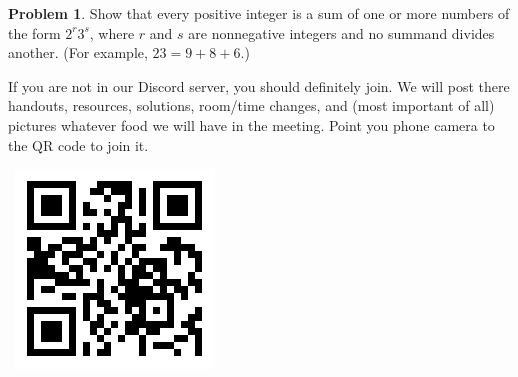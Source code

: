 \documentclass{scrartcl}
\theoremstyle{definition}
\newtheorem{prob}{Problem}
\begin{document}
	\begin{prob}%
		Show that every positive integer is a sum of one or more numbers of the form \(2^r3^s\), where \(r\) and \(s\) are nonnegative integers and no summand divides another. (For example, \(23 = 9 + 8 + 6\).)
	\end{prob}

	\vfill

	\begin{minipage}{.85\textwidth}{}
		\footnotesize
		If you are not in our Discord server, you should definitely join.
		We will post there handouts, resources, solutions, room/time changes, and (most important of all) pictures whatever food we will have in the meeting. Point you phone camera to the QR code to join it.
	\end{minipage}
	\begin{minipage}{.15\textwidth}{}
		\ \hfill \includegraphics[height = .8in]{qr}
	\end{minipage}
\end{document}

